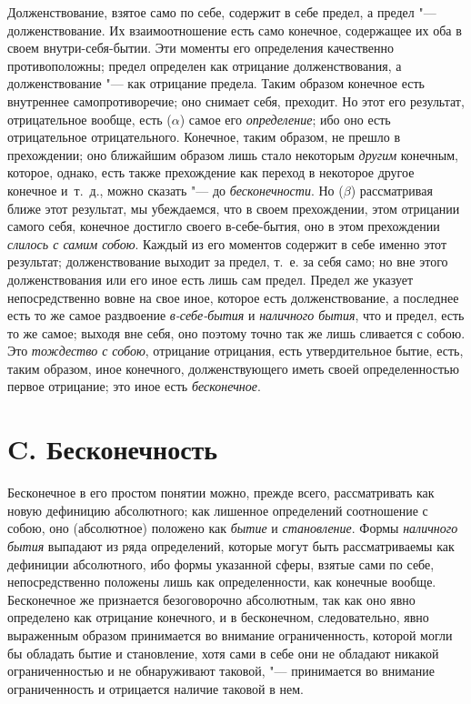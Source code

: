 Долженствование, взятое само по себе, содержит в себе предел, а предел
"--- долженствование. Их взаимоотношение есть само конечное, содержащее их оба
в своем внутри-себя-бытии. Эти моменты его определения качественно
противоположны; предел определен как отрицание долженствования, а
долженствование "--- как отрицание предела. Таким образом конечное есть
внутреннее самопротиворечие; оно снимает себя, преходит. Но этот его
результат, отрицательное вообще, есть ($\alpha $) самое его
{\em определение}; ибо оно есть отрицательное
отрицательного. Конечное, таким образом, не прешло в прехождении; оно
ближайшим образом лишь стало некоторым {\em другим}
конечным, которое, однако, есть также прехождение как переход в некоторое
другое конечное и~т.~д., можно сказать "--- до
{\em бесконечности}. Но ($\beta $) рассматривая ближе
этот результат, мы убеждаемся, что в своем прехождении, этом отрицании
самого себя, конечное достигло своего в-себе-бытия, оно в этом прехождении
{\em слилось с самим собою}. Каждый из его моментов
содержит в себе именно этот результат; долженствование выходит за
предел, т.~е. за себя само; но вне этого долженствования или его иное
есть лишь сам предел. Предел же указует непосредственно вовне на свое
иное, которое есть долженствование, а последнее есть то же самое
раздвоение {\em в-себе-бытия} и
{\em наличного бытия}, что и предел, есть то же самое;
выходя вне себя, оно поэтому точно так же лишь сливается с собою. Это
{\em тождество с собою}, отрицание отрицания, есть
утвердительное бытие, есть, таким образом, иное конечного,
долженствующего иметь своей определенностью первое отрицание; это иное
есть {\em бесконечное}.

\section[C. Бесконечность]{C. Бесконечность}
Бесконечное в его простом понятии можно, прежде всего, рассматривать как
новую дефиницию абсолютного; как лишенное определений соотношение с собою,
оно (абсолютное) положено как {\em бытие} и
{\em становление}. Формы
{\em наличного бытия} выпадают из ряда определений,
которые могут быть рассматриваемы как дефиниции абсолютного, ибо формы
указанной сферы, взятые сами по себе, непосредственно положены лишь как
определенности, как конечные вообще. Бесконечное же признается
безоговорочно абсолютным, так как оно явно определено как отрицание
конечного, и в бесконечном, следовательно, явно выраженным образом
принимается во внимание ограниченность, которой могли бы обладать бытие и
становление, хотя сами в себе они не обладают никакой ограниченностью и не
обнаруживают таковой, "--- принимается во внимание ограниченность и отрицается
наличие таковой в нем.

